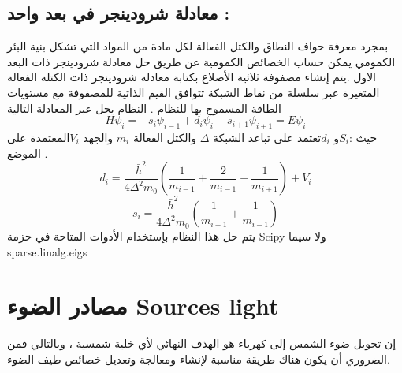 \subsection{  معادلة شرودينجر في  بعد واحد :  }
بمجرد معرفة حواف النطاق والكتل الفعالة لكل مادة من المواد التي تشكل بنية البئر الكمومي يمكن حساب الخصائص الكمومية عن طريق حل معادلة شرودينجر ذات البعد الاول .يتم إنشاء مصفوفة ثلاثية الأضلاع بكتابة معادلة شرودينجر ذات الكتلة الفعالة المتغيرة عبر سلسلة من نقاط الشبكة تتوافق القيم الذاتية للمصفوفة مع مستويات الطاقة المسموح بها للنظام . النظام يحل عبر المعادلة التالية 
\begin{equation}
	H\psi_i= -s_i\psi_{i-1}+d_i\psi_i-s_{i+1}\psi_{i+1}=E\psi_i
\end{equation}
حيث :$ S_i  $و $ d_i  $تعتمد على تباعد الشبكة  $\Delta$ والكتل الفعالة $ m_i $ والجهد  $ V_i  $المعتمدة على الموضع .
\begin{equation}
	d_i=\frac{\bar{h}^2}{ 4\Delta^2 m_0}(\frac{1}{ m_{i-1}}+\frac{2}{ m_{i-1}}+\frac{1}{ m_{ i+1}}) +V_i
\end{equation}
\begin{equation}
	s_i=\frac{ \bar{h}^2}{4\Delta^2 m_0 }(\frac{1}{ m_{i-1}}+\frac{1}{ m_{ i-1}})
\end{equation}
يتم حل هذا النظام بإستخدام  الأدوات المتاحة في حزمة Scipy ولا سيما           
sparse.linalg.eigs
\section{   مصادر الضوء Sources light }
إن تحويل ضوء الشمس إلى كهرباء هو الهذف النهائي لأي خلية شمسية ،  وبالتالي فمن الضروري أن يكون هناك طريقة مناسبة لإنشاء ومعالجة وتعديل خصائص طيف الضوء. \\ 

